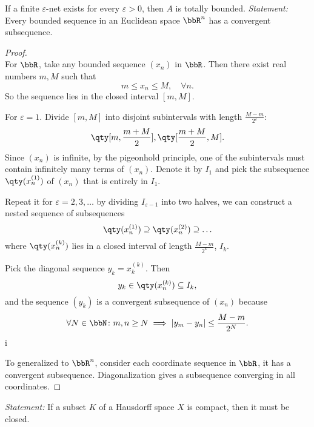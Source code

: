 \documentclass[a4paper,12pt]{article}
\begin{document}
If a finite $\varepsilon$-net exists for every $\varepsilon>0$, then $A$ is totally bounded.
\textit{Statement: }Every bounded sequence in an Euclidean space $\bbR^n$ has a convergent subsequence.

\begin{proof}\mbox{}\\
    For $\bbR$, take any bounded sequence $(x_n)$ in $\bbR$. Then there exist real numbers $m,M$ such that
    \[m\leq x_n\leq M,\quad\forall n.\]
    So the sequence lies in the closed interval $[m,M]$.

    For $\varepsilon=1$. Divide $[m,M]$ into disjoint subintervals with length $\frac{M-m}{2^\varepsilon}$:
    \[\qty[m,\frac{m+M}{2}],\qty[\frac{m+M}{2},M].\]
    Since $(x_n)$ is infinite, by the pigeonhold principle, one of the subintervals must contain infinitely many terms of $(x_n)$. Denote it by $I_1$ and pick the subsequence $\qty(x_n^{(1)})$ of $(x_n)$ that is entirely in $I_1$.

    Repeat it for $\varepsilon=2,3,\ldots$ by dividing $I_{\varepsilon-1}$ into two halves, we can construct a nested sequence of subsequences
    \[\qty(x_n^{(1)})\supseteq \qty(x_n^{(2)})\supseteq\ldots\]
    where $\qty(x_n^{(k)})$ lies in a closed interval of length $\frac{M-m}{2^k}$, $I_k$.

    Pick the diagonal sequence $y_k=x_k^(k)$. Then
    \[y_k\in\qty(x_n^{(k)})\subseteq I_k,\]
    and the sequence $(y_k)$ is a convergent subsequence of $(x_n)$ because
    \[\forall N\in\bbN\colon m,n\geq N\implies |y_m-y_n|\leq\frac{M-m}{2^N}.\]i

    To generalized to $\bbR^n$, consider each coordinate sequence in $\bbR$, it has a convergent subsequence. Diagonalization gives a subsequence converging in all coordinates.
\end{proof}
\textit{Statement:} If a subset $K$ of a Hausdorff space $X$ is compact, then it must be closed.
\end{document}

